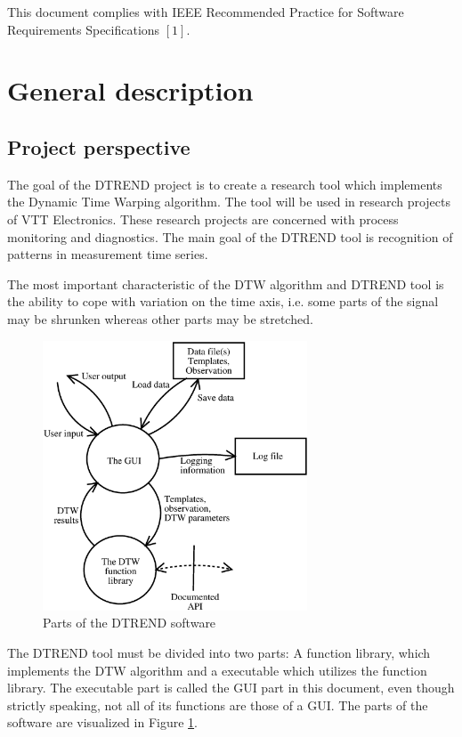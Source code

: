 \documentclass[a4paper,11pt]{article}
\begin{document}
This document complies with IEEE Recommended Practice for Software Requirements Specifications $[1]$.

\section{General description}

\subsection{Project perspective}

The goal of the DTREND project is to create a research tool which implements the Dynamic Time Warping algorithm. 
The tool will be used in research projects of VTT Electronics. These research projects are concerned with process 
monitoring and diagnostics. The main goal of the DTREND tool is recognition of patterns in measurement time series. 

The most important characteristic of the DTW algorithm and DTREND tool is the ability to cope with variation on the
time axis, i.e. some parts of the signal may be shrunken whereas other parts may be stretched.

\begin{figure} 
\begin{center} 
\includegraphics[width=0.7\textwidth]{srs_components.eps}
\caption{Parts of the DTREND software} 
\label{fig:components}
\end{center} 
\end{figure}

The DTREND tool must be divided into two parts: A function library, which implements the DTW algorithm and a 
executable which utilizes the function library. The executable part is called the GUI part in this document, even though
strictly speaking, not all of its functions are those of a GUI. The parts of the software are visualized in Figure 
\ref{fig:components}.
\end{document}

